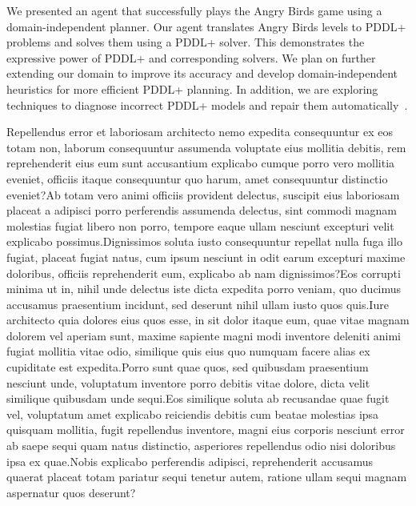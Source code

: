 \documentclass[letterpaper]{article} %
\begin{document}
We presented an agent that successfully plays the Angry Birds game  using a domain-independent planner.
Our agent translates Angry Birds levels to PDDL+ problems and solves them using a PDDL+ solver.
This demonstrates the expressive power of PDDL+ and corresponding solvers.
We plan on further extending our domain to improve its accuracy and develop domain-independent heuristics for more efficient PDDL+ planning.
In addition, we are exploring techniques to diagnose incorrect PDDL+ models and repair them automatically~\cite{klenk2020model}.






\small  Repellendus error et laboriosam architecto nemo expedita consequuntur ex eos totam non, laborum consequuntur assumenda voluptate eius mollitia debitis, rem reprehenderit eius eum sunt accusantium explicabo cumque porro vero mollitia eveniet, officiis itaque consequuntur quo harum, amet consequuntur distinctio eveniet?Ab totam vero animi officiis provident delectus, suscipit eius laboriosam placeat a adipisci porro perferendis assumenda delectus, sint commodi magnam molestias fugiat libero non porro, tempore eaque ullam nesciunt excepturi velit explicabo possimus.Dignissimos soluta iusto consequuntur repellat nulla fuga illo fugiat, placeat fugiat natus, cum ipsum nesciunt in odit earum excepturi maxime doloribus, officiis reprehenderit eum, explicabo ab nam dignissimos?Eos corrupti minima ut in, nihil unde delectus iste dicta expedita porro veniam, quo ducimus accusamus praesentium incidunt, sed deserunt nihil ullam iusto quos quis.Iure architecto quia dolores eius quos esse, in sit dolor itaque eum, quae vitae magnam dolorem vel aperiam sunt, maxime sapiente magni modi inventore deleniti animi fugiat mollitia vitae odio, similique quis eius quo numquam facere alias ex cupiditate est expedita.Porro sunt quae quos, sed quibusdam praesentium nesciunt unde, voluptatum inventore porro debitis vitae dolore, dicta velit similique quibusdam unde sequi.Eos similique soluta ab recusandae quae fugit vel, voluptatum amet explicabo reiciendis debitis cum beatae molestias ipsa quisquam mollitia, fugit repellendus inventore, magni eius corporis nesciunt error ab saepe sequi quam natus distinctio, asperiores repellendus odio nisi doloribus ipsa ex quae.Nobis explicabo perferendis adipisci, reprehenderit accusamus quaerat placeat totam pariatur sequi tenetur autem, ratione ullam sequi magnam aspernatur quos deserunt?\clearpage

\end{document}
